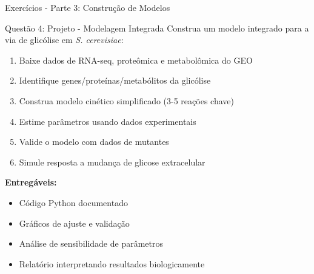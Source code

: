 \begin{frame}{Exercícios - Parte 3: Construção de Modelos}
\begin{alertblock}{Questão 4: Projeto - Modelagem Integrada}
Construa um modelo integrado para a via de glicólise em \textit{S. cerevisiae}:
\begin{enumerate}
    \item Baixe dados de RNA-seq, proteômica e metabolômica do GEO
    \item Identifique genes/proteínas/metabólitos da glicólise
    \item Construa modelo cinético simplificado (3-5 reações chave)
    \item Estime parâmetros usando dados experimentais
    \item Valide o modelo com dados de mutantes
    \item Simule resposta a mudança de glicose extracelular
\end{enumerate}

\textbf{Entregáveis:}
\begin{itemize}
    \item Código Python documentado
    \item Gráficos de ajuste e validação
    \item Análise de sensibilidade de parâmetros
    \item Relatório interpretando resultados biologicamente
\end{itemize}
\end{alertblock}
\end{frame}

